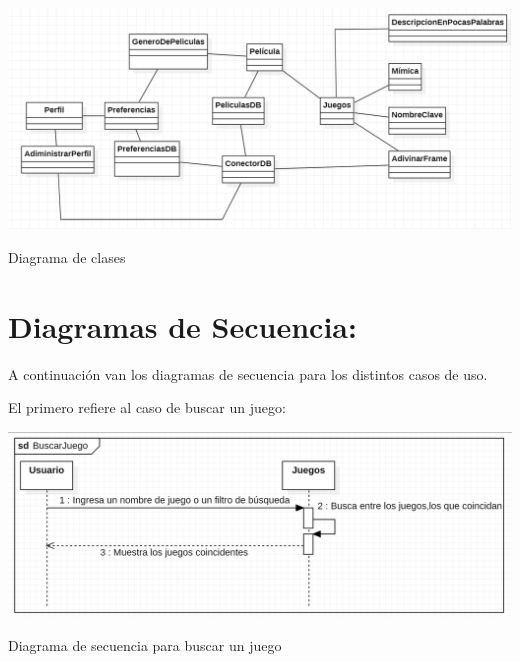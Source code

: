 \documentclass[12pt, oneside, letterpaper]{book}
\begin{document}
\begin{center}
	\centering
		\includegraphics[width=1.2\textwidth]{DiagramaDeClasesFriendsNight.png}

	\caption{Diagrama de clases}
	\label{DiagramaClases}
\end{center}
\vspace{1cm}
\section{Diagramas de Secuencia:}
\fontsize{14}{18}\selectfont
\par 
A continuación van los diagramas de secuencia para los distintos casos de uso.

El primero refiere al caso de buscar un juego:

\begin{center}
	\centering
		\includegraphics[width=1.2\textwidth]{DSFNBuscarJuego.png}

	\caption{Diagrama de secuencia para buscar un juego}
	\label{DSFNBuscarJuego}
\end{center}
\end{document}
